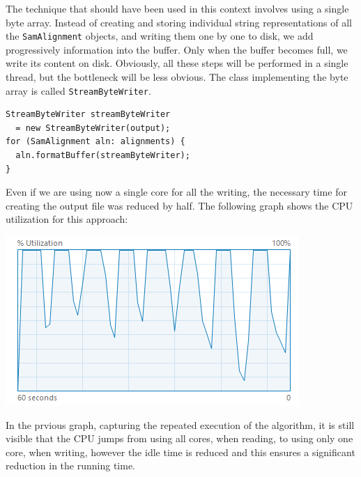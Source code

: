 \documentclass[a4paper,twoside]{article}
\begin{document}
The technique that should have been used in this context involves using a single byte array.
Instead of creating and storing individual string representations of all the {\texttt{SamAlignment}} objects, and writing them one by one to disk, we add progressively information into the buffer.
Only when the buffer becomes full, we write its content on disk.
Obviously, all these steps will be performed in a single thread, but the bottleneck will be less obvious.
The class implementing the byte array is called {\texttt{StreamByteWriter}}.
\begin{verbatim}
StreamByteWriter streamByteWriter 
  = new StreamByteWriter(output);
for (SamAlignment aln: alignments) {
  aln.formatBuffer(streamByteWriter);
}
\end{verbatim}
Even if we are using now a single core for all the writing, the necessary time for creating the output file was reduced by half.
The following graph shows the CPU utilization for this approach:
\begin{center}
\includegraphics[scale=0.5]{images/cpu_optimized.png}
\end{center}

In the prvious graph, capturing the repeated execution of the algorithm, it is still visible that the CPU jumps from using all cores, when reading, to using only one core, when writing, however the idle time is reduced and this ensures a significant reduction in the running time.
\end{document}
